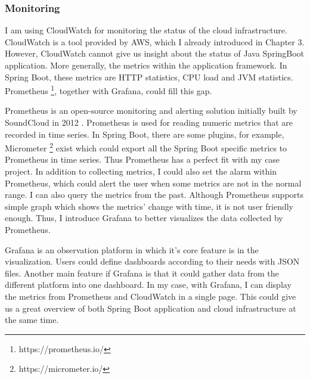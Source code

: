 \subsubsection{Monitoring}
I am using CloudWatch for monitoring the status of the cloud infrastructure. CloudWatch is a tool provided by AWS, which I already introduced in Chapter 3. However, CloudWatch cannot give us insight about the status of Java SpringBoot application. More generally, the metrics within the application framework. In Spring Boot, these metrics are HTTP statistics, CPU load and JVM statistics. Prometheus \footnote{https://prometheus.io/}, together with Grafana, could fill this gap.
\par
Prometheus is an open-source monitoring and alerting solution initially built by SoundCloud in 2012 \cite{Overview30:online}. Prometheus is used for reading numeric metrics that are recorded in time series. In Spring Boot, there are some plugins, for example, Micrometer \footnote{https://micrometer.io/} exist which could export all the Spring Boot specific metrics to Prometheus in time series. Thus Prometheus has a perfect fit with my case project. In addition to collecting metrics, I could also set the alarm within Prometheus, which could alert the user when some metrics are not in the normal range. I can also query the metrics from the past. Although Prometheus supports simple graph which shows the metrics' change with time, it is not user friendly enough. Thus, I introduce Grafana to better visualizes the data collected by Prometheus.
\par
Grafana is an observation platform in which it's core feature is in the visualization. Users could define dashboards according to their needs with JSON files. Another main feature if Grafana is that it could gather data from the different platform into one dashboard. In my case, with Grafana, I can display the metrics from Prometheus and CloudWatch in a single page. This could give us a great overview of both Spring Boot application and cloud infrastructure at the same time.
